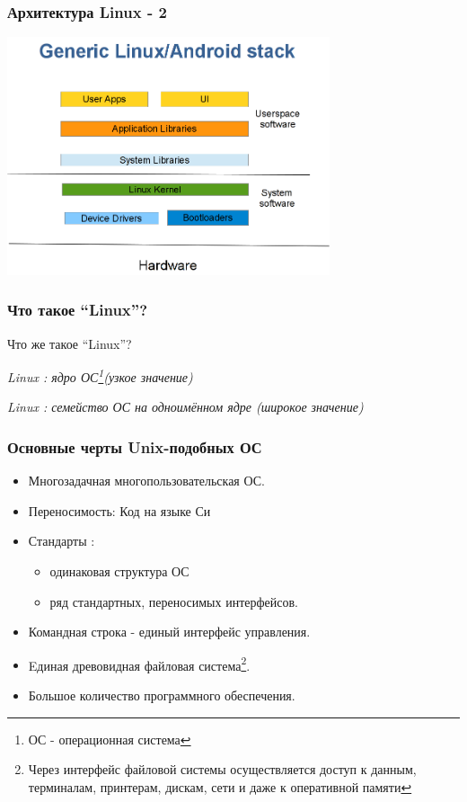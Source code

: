 \begin{frame}
  \frametitle{Архитектура Linux - 2}

  \begin{center}
    \includegraphics[height=7cm]{linux-software-stack}
  \end{center}

\end{frame}

\begin{frame}
  \frametitle{Что такое ``Linux''?}
  \begin{center}
    \alert{Что же такое ``Linux''?}
  \end{center}

  \pause 

  \emph{Linux : ядро ОС\footnote{ОС - операционная система}(узкое значение)}
  \newline
  \pause

  \emph{Linux : семейство ОС на одноимённом ядре (широкое значение)}

\end{frame}

\begin{frame}
  \frametitle{Основные черты Unix-подобных ОС}

  \begin{itemize}
    \item Многозадачная многопользовательская ОС.
    \item Переносимость: Код на языке Си
    \item Стандарты :
      \begin{itemize} 
	\item одинаковая структура ОС
	\item ряд стандартных, переносимых интерфейсов.
      \end{itemize}
    \item Командная строка - единый интерфейс управления.
    \item Eдиная древовидная файловая система\footnote{Через интерфейс файловой системы осуществляется доступ к данным, терминалам, принтерам, дискам, сети и даже к оперативной памяти}.
    \item Большое количество программного обеспечения.
  \end{itemize}
\end{frame}

